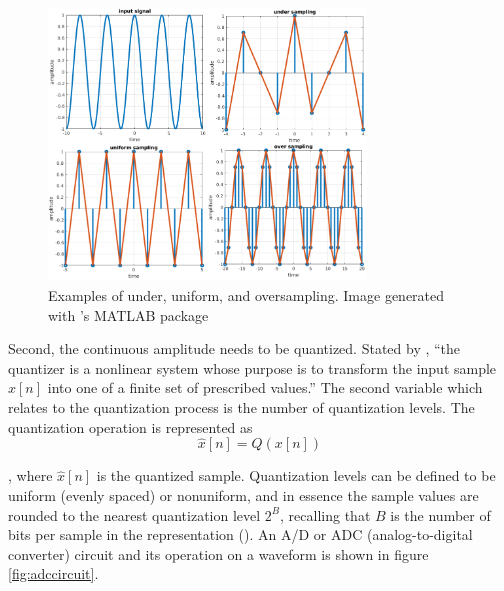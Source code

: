\documentclass[report.tex]{subfiles}
\begin{document}
\begin{figure}[ht]
	\centering
	\includegraphics[width=0.75\textwidth]{./images-tftheory/aliasing.png}
	\caption{Examples of under, uniform, and oversampling. Image generated with \textcite{aliasmatlab}'s MATLAB package}
	\label{fig:aliasing}
\end{figure}

Second, the continuous amplitude needs to be quantized. Stated by \textcite[Chapter~4]{discretebook}, ``the quantizer is a nonlinear system whose purpose is to transform the input sample $x[n]$ into one of a finite set of prescribed values.'' The second variable which relates to the quantization process is the number of quantization levels. The quantization operation is represented as
\[ \hat{x}[n] = Q(x[n]) \]

, where $\hat{x}[n]$ is the quantized sample. Quantization levels can be defined to be uniform (evenly spaced) or nonuniform, and in essence the sample values are rounded to the nearest quantization level $2^{B}$, recalling that $B$ is the number of bits per sample in the representation (\cite{discretebook}). An A/D or ADC (analog-to-digital converter) circuit and its operation on a waveform is shown in figure \ref{fig:adccircuit}.
\end{document}
